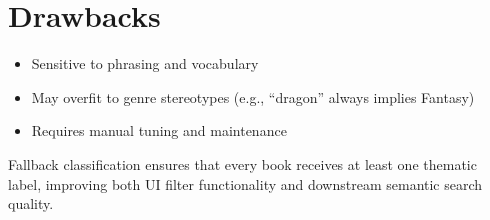 \section*{Drawbacks}
\begin{itemize}
  \item Sensitive to phrasing and vocabulary
  \item May overfit to genre stereotypes (e.g., “dragon” always implies Fantasy)
  \item Requires manual tuning and maintenance
\end{itemize}

Fallback classification ensures that every book receives at least one thematic label, improving both UI filter functionality and downstream semantic search quality.

